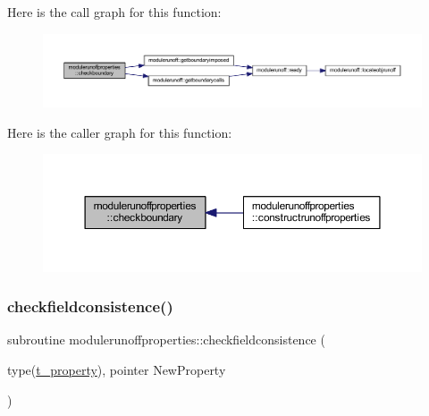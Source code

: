 Here is the call graph for this function\+:\nopagebreak
\begin{figure}[H]
\begin{center}
\leavevmode
\includegraphics[width=350pt]{namespacemodulerunoffproperties_aad3a8c2b2f6443fbd1a8c4ef4f14a275_cgraph}
\end{center}
\end{figure}
Here is the caller graph for this function\+:\nopagebreak
\begin{figure}[H]
\begin{center}
\leavevmode
\includegraphics[width=350pt]{namespacemodulerunoffproperties_aad3a8c2b2f6443fbd1a8c4ef4f14a275_icgraph}
\end{center}
\end{figure}
\mbox{\label{namespacemodulerunoffproperties_a06845b65870b1cb0e5333b9ef618d43d}} 
\subsubsection{\texorpdfstring{checkfieldconsistence()}{checkfieldconsistence()}}
{\footnotesize\ttfamily subroutine modulerunoffproperties\+::checkfieldconsistence (\begin{DoxyParamCaption}\item[{type(\mbox{\hyperlink{structmodulerunoffproperties_1_1t__property}{t\+\_\+property}}), pointer}]{New\+Property }\end{DoxyParamCaption})\hspace{0.3cm}{\ttfamily [private]}}

